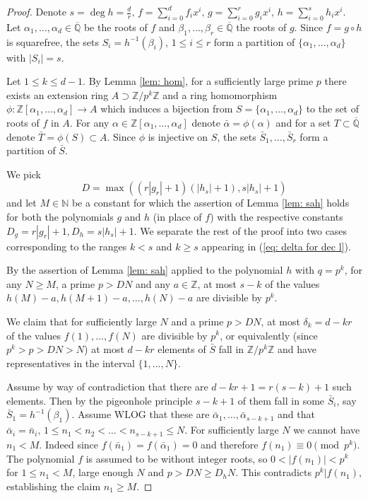 \documentclass[alphabetic]{amsart}
\theoremstyle{definition}
\numberwithin{equation}{section}
\newcommand{\case}[1]{\vspace{0.3cm}\noindent\framebox{#1.}}
\newcommand{\Z}{{\mathbb Z}}
\newcommand{\Q}{{\mathbb Q}}
\newcommand{\Qb}{{\overline{\Q}}}
\newcommand{\N}{{\mathbb N}}
\numberwithin{equation}{section}
\begin{document}
\begin{proof}

Denote 
$s=\deg h=\frac dr,\,f=\sum_{i=0}^df_ix^i,\, g=\sum_{i=0}^rg_ix^i,\,h=\sum_{i=0}^sh_ix^i.$
Let $\alpha_1,\ldots,\alpha_d\in\Qb$ be the roots of $f$ and $\beta_1,\ldots,\beta_r\in\Qb$ the roots of $g$. Since $f=g\circ h$ is squarefree, the sets $S_i=h^{-1}(\beta_i),\,1\le i\le r$ form a partition of $\{\alpha_1,\ldots,\alpha_d\}$ with $|S_i|=s$.

Let $1\le k\le d-1$. By Lemma \ref{lem: hom}, for a sufficiently large prime $p$ there exists an extension ring $A\supset\Z/p^k\Z$ and a ring homomorphism $\phi:\Z[\alpha_1,\ldots,\alpha_d]\to A$ which induces a bijection from $S=\{\alpha_1,\ldots,\alpha_d\}$ to the set of roots of $f$ in $A$. For any $\alpha\in\Z[\alpha_1,\ldots,\alpha_d]$ denote $\bar\alpha=\phi(\alpha)$ and for a set $T\subset\Qb$ denote $\bar T=\phi(S)\subset A$. Since $\phi$ is injective on $S$, the sets $\bar S_1,\ldots,\bar S_r$ form a partition of $\bar S$.

We pick $$D=\max\left((r|g_r|+1)(|h_s|+1),s|h_s|+1\right)$$ and let $M\in\N$ be a constant for which the assertion of Lemma \ref{lem: sah} holds for both the polynomials $g$ and $h$ (in place of $f$) with the respective constants $D_g=r|g_r|+1,D_h=s|h_s|+1$.
We separate the rest of the proof into two cases corresponding to the ranges $k<s$ and $k\ge s$ appearing in (\ref{eq: delta for dec l}).

\case{$k\le s-1$} By the assertion of Lemma \ref{lem: sah} applied to the polynomial $h$ with $q=p^k$, for any $N\ge M$, a prime $p>DN$ and any $a\in\Z$, at most $s-k$ of the values $h(M)-a,h(M+1)-a,\ldots,h(N)-a$ are divisible by $p^k$.

We claim that for  sufficiently large $N$ and a prime $p>DN$, at most $\delta_k=d-kr$ of the values $f(1),\ldots,f(N)$ are divisible by $p^k$, or equivalently (since $p^k>p>DN>N$) at most $d-kr$ elements of $\bar S$ fall in $\Z/p^k\Z$ and have representatives in the interval $\{1,\ldots,N\}$.

Assume by way of contradiction that there are $d-kr+1=r(s-k)+1$ such elements. 
Then by the pigeonhole principle $s-k+1$ of them fall in some $\bar S_i$, say $\bar S_1=h^{-1}(\beta_1)$. Assume WLOG that these are $\bar\alpha_1,\ldots,\bar\alpha_{s-k+1}$ and that $\bar\alpha_i=\bar n_i,\,1\le n_1<n_2<\ldots<n_{s-k+1}\le N$. 
For sufficiently large $N$ we cannot have $n_1<M$. Indeed since $f(\bar n_1)=f(\bar\alpha_1)=0$ and therefore $f(n_1)\equiv 0\pmod {p^k}$. The polynomial $f$ is assumed to be without integer roots, so $0<|f(n_1)|<p^k$ for $1\le n_1<M$, large enough $N$ and $p>DN\ge D_hN$. This contradicts $p^k|f(n_1)$, establishing the claim $n_1\ge M$.


\end{proof}
\end{document}
